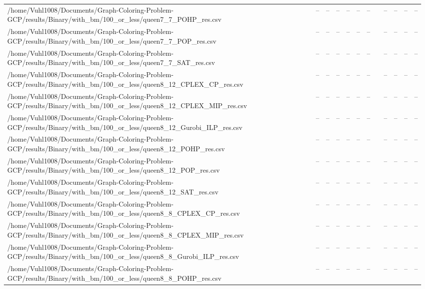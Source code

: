 \begin{table}[htbp]
\begin{tabular}{llllllllllll}
/home/Vuhl1008/Documents/Graph-Coloring-Problem-GCP/results/Binary/with\_bm/100\_or\_less/queen7\_7\_POHP\_res.csv & -- & -- & -- & -- & -- & -- & {} & -- & -- & -- & -- \\
/home/Vuhl1008/Documents/Graph-Coloring-Problem-GCP/results/Binary/with\_bm/100\_or\_less/queen7\_7\_POP\_res.csv & -- & -- & -- & -- & -- & -- & {} & -- & -- & -- & -- \\
/home/Vuhl1008/Documents/Graph-Coloring-Problem-GCP/results/Binary/with\_bm/100\_or\_less/queen7\_7\_SAT\_res.csv & -- & -- & -- & -- & -- & -- & {} & -- & -- & -- & -- \\
/home/Vuhl1008/Documents/Graph-Coloring-Problem-GCP/results/Binary/with\_bm/100\_or\_less/queen8\_12\_CPLEX\_CP\_res.csv & -- & -- & -- & -- & -- & -- & {} & -- & -- & -- & -- \\
/home/Vuhl1008/Documents/Graph-Coloring-Problem-GCP/results/Binary/with\_bm/100\_or\_less/queen8\_12\_CPLEX\_MIP\_res.csv & -- & -- & -- & -- & -- & -- & {} & -- & -- & -- & -- \\
/home/Vuhl1008/Documents/Graph-Coloring-Problem-GCP/results/Binary/with\_bm/100\_or\_less/queen8\_12\_Gurobi\_ILP\_res.csv & -- & -- & -- & -- & -- & -- & {} & -- & -- & -- & -- \\
/home/Vuhl1008/Documents/Graph-Coloring-Problem-GCP/results/Binary/with\_bm/100\_or\_less/queen8\_12\_POHP\_res.csv & -- & -- & -- & -- & -- & -- & {} & -- & -- & -- & -- \\
/home/Vuhl1008/Documents/Graph-Coloring-Problem-GCP/results/Binary/with\_bm/100\_or\_less/queen8\_12\_POP\_res.csv & -- & -- & -- & -- & -- & -- & {} & -- & -- & -- & -- \\
/home/Vuhl1008/Documents/Graph-Coloring-Problem-GCP/results/Binary/with\_bm/100\_or\_less/queen8\_12\_SAT\_res.csv & -- & -- & -- & -- & -- & -- & {} & -- & -- & -- & -- \\
/home/Vuhl1008/Documents/Graph-Coloring-Problem-GCP/results/Binary/with\_bm/100\_or\_less/queen8\_8\_CPLEX\_CP\_res.csv & -- & -- & -- & -- & -- & -- & {} & -- & -- & -- & -- \\
/home/Vuhl1008/Documents/Graph-Coloring-Problem-GCP/results/Binary/with\_bm/100\_or\_less/queen8\_8\_CPLEX\_MIP\_res.csv & -- & -- & -- & -- & -- & -- & {} & -- & -- & -- & -- \\
/home/Vuhl1008/Documents/Graph-Coloring-Problem-GCP/results/Binary/with\_bm/100\_or\_less/queen8\_8\_Gurobi\_ILP\_res.csv & -- & -- & -- & -- & -- & -- & {} & -- & -- & -- & -- \\
/home/Vuhl1008/Documents/Graph-Coloring-Problem-GCP/results/Binary/with\_bm/100\_or\_less/queen8\_8\_POHP\_res.csv & -- & -- & -- & -- & -- & -- & {} & -- & -- & -- & -- \\

\end{tabular}
\end{table}
